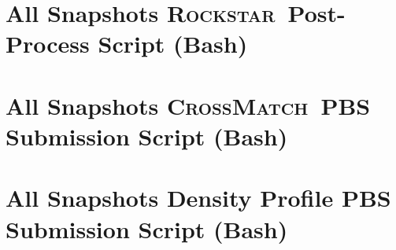 \documentclass[12pt]{report}
\newcommand{\rockstar}{\textsc{Rockstar}}
\newcommand{\crossmatch}{\textsc{CrossMatch}}
\begin{document}
\begin{appendices}
	\section{All Snapshots \rockstar\ Post-Process Script (Bash)}
	\label{app:postprocess_all}
	
	\section{All Snapshots \crossmatch\ PBS Submission Script (Bash)}
	\label{app:run_crossmatch}
	
	\section{All Snapshots Density Profile PBS Submission Script (Bash)}
	\label{app:run_density_profile}
	

\end{appendices}
\end{document}
